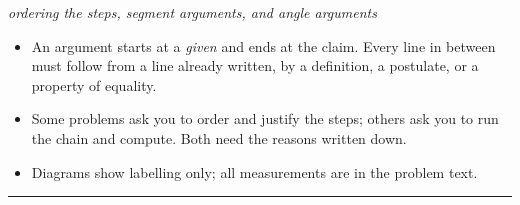 \documentclass[12pt]{article}
\begin{document}

\begin{center}\small\textit{ordering the steps, segment arguments, and angle arguments}\end{center}

\begin{itemize}[leftmargin=0.8cm, itemsep=1pt, topsep=2pt]
  \item An argument starts at a \emph{given} and ends at the claim. Every line in between must follow from a line already written, by a definition, a postulate, or a property of equality.
  \item Some problems ask you to order and justify the steps; others ask you to run the chain and compute. Both need the reasons written down.
  \item Diagrams show labelling only; all measurements are in the problem text.
\end{itemize}

\vspace{0.2cm}\noindent\rule{\linewidth}{0.4pt}

\end{document}
